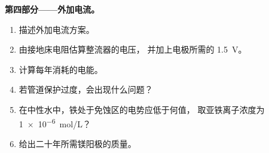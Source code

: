 \begin{problem}
\medskip
\noindent\textbf{第四部分——外加电流。}
\begin{enumerate}[resume]
  \item 描述外加电流方案。
  \item 由接地床电阻估算整流器的电压，
        并加上电极所需的 \qty{1.5}{V}。
  \item 计算每年消耗的电能。
  \item 若管道保护过度，会出现什么问题？
  \item 在中性水中，铁处于免蚀区的电势应低于何值，
        取亚铁离子浓度为 \qty{1e-6}{mol/L}？
  \item 给出二十年所需镁阳极的质量。
\end{enumerate}
\end{problem}
